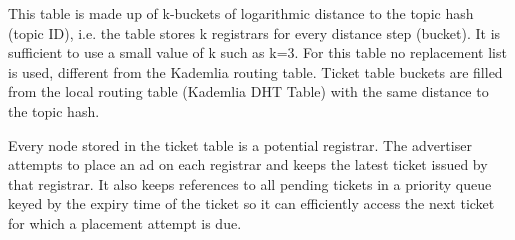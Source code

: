 This table is made up of k-buckets of logarithmic distance to the topic hash (topic ID), i.e. the table stores k registrars for every distance step (bucket). It is sufficient to use a small value of k such as k=3. For this table no replacement list is used, different from the Kademlia routing table. Ticket table buckets are filled from the local routing table (Kademlia DHT Table) with the same distance to the topic hash.

Every node stored in the ticket table is a potential registrar. The advertiser attempts to place an ad on each registrar and keeps the latest ticket issued by that registrar. It also keeps references to all pending tickets in a priority queue keyed by the expiry time of the ticket so it can efficiently access the next ticket for which a placement attempt is due.

